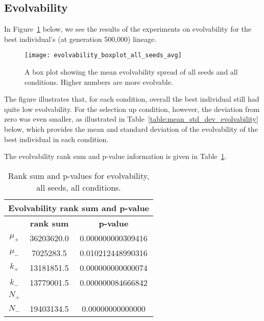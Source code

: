 \subsection{Evolvability}
In Figure~\ref{fig:evolvability_mean} below, we see the results of the experiments on evolvability for the best individual's (at generation 500,000) lineage. 
\begin{figure}[H]
	\centering
	\texttt{[image: evolvability\_boxplot\_all\_seeds\_avg]}
	\caption[Evolvability boxplot]{A box plot showing the mean evolvability spread of all seeds and all conditions. Higher numbers are more evolvable.}
	\label{fig:evolvability_mean}	
\end{figure}
The figure illustrates that, for each condition, overall the best individual still had quite low evolvability. For the selection up condition, however, the deviation from zero was even smaller, as illustrated in Table~\ref{table:mean_std_dev_evolvability} below, which provides the mean and standard deviation of the evolvability of the best individual in each condition. 

The evolvability rank sum and p-value information is given in Table~\ref{table:evolvability-rank_sum_and_p-values}.

\begin{table}[H]
	\begin{tabular}{|c|c|c|}
		\hline
		\multicolumn{3}{c}{\Large \textbf{Evolvability rank sum and p-value}} \\
		\hline
		& \textbf{rank sum} & \textbf{p-value} \\
		\hline
		$\mu_+$ & 36203620.0 & 0.000000000309416 \\
		\hline
		$\mu_-$ & 7025283.5 & 0.010212448990316 \\
		\hline
		$k_+$ & 13181851.5 & 0.000000000000074 \\
		\hline
		$k_-$ & 13779001.5 & 0.000000084666842 \\
		\hline
		$N_+$ & & \\
		\hline
		$N_-$ & 19403134.5 & 0.00000000000000 \\
		\hline
	\end{tabular}
	\caption[Evolvability - rank sum and p-value]{Rank sum and p-values for evolvability, all seeds, all conditions.}
	\label{table:evolvability-rank_sum_and_p-values}
\end{table}

